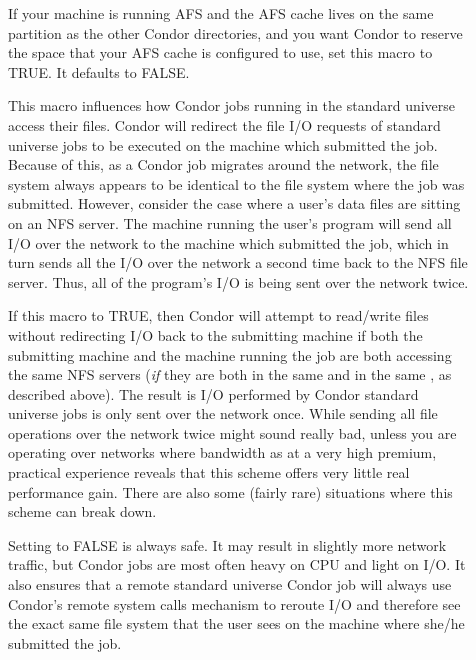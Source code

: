 \begin{description}
  
  
\item[] \label{param:ReserveAfsCache} If
  your machine is running AFS and the AFS cache lives on the same
  partition as the other Condor directories, and you want Condor to
  reserve the space that your AFS cache is configured to use, set this
  macro to TRUE.  It defaults to FALSE.
  
\item[] \label{param:UseNfs} This macro influences
  how Condor jobs running in the standard universe access their
  files.  Condor will redirect the file I/O requests
  of standard universe jobs to be executed on the machine which
  submitted the job.  Because of this, as a Condor job migrates around
  the network, the file system always appears to be identical to the
  file system where the job was submitted.  However, consider the case
  where a user's data files are sitting on an NFS server. The machine
  running the user's program will send all I/O over the network to the
  machine which submitted the job, which in turn sends all the I/O
  over the network a second time back to the NFS file server. Thus,
  all of the program's I/O is being sent over the network twice.
  
  If this macro to TRUE, then Condor will attempt to
  read/write files without redirecting I/O back to the submitting
  machine if both the submitting machine and the machine running the job
  are both accessing the same NFS servers (\emph{if} they are both in the
  same  and in the same ,
  as described above).  The result is I/O performed by Condor standard
  universe jobs is only sent over the network once.  
  While sending all file operations over the network twice might sound
  really bad, unless you are operating over networks where bandwidth
  as at a very high premium, practical experience reveals that this
  scheme offers very little real performance gain.  There are also
  some (fairly rare) situations where this scheme can break down.
  
  Setting  to FALSE is always safe.  It may result
  in slightly more network traffic, but Condor jobs are most often heavy
  on CPU and light on I/O.  It also ensures that a remote
  standard universe Condor job will always use Condor's remote system
  calls mechanism to reroute I/O and therefore see the exact same
  file system that the user sees on the machine where she/he submitted
  the job.
  

\end{description}

